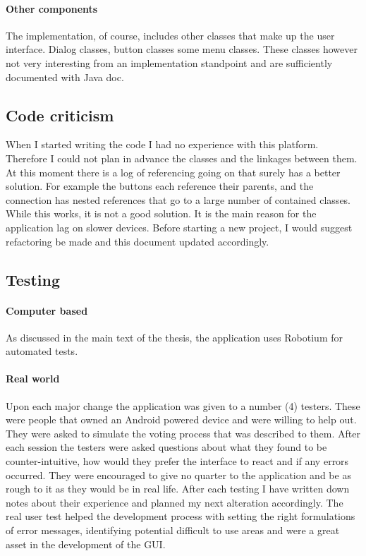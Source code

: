 \documentclass[11pt]{article} %
\begin{document}
\paragraph{Other components}
The implementation, of course, includes other classes that make up the user interface. Dialog classes, button classes some menu classes. These classes however not very interesting from an implementation standpoint and are sufficiently documented with Java doc.
\subsection{Code criticism}
When I started writing the code I had no experience with this platform. Therefore I could not plan in advance the classes and the linkages between them. At this moment there is a log of referencing going on that surely has a better solution. For example the buttons each reference their parents, and the connection has nested references that go to a large number of contained classes. While this works, it is not a good solution. It is the main reason for the application lag on slower devices. Before starting a new project, I would suggest refactoring be made and this document updated accordingly.
\subsection{Testing}
\paragraph{Computer based}
As discussed in the main text of the thesis, the application uses Robotium for automated tests.
\paragraph{Real world}
Upon each major change the application was  given to a number (4) testers. These were people that owned an Android powered device and were willing to help out. They were asked to simulate the voting process that was described to them. After each session the testers were asked questions about what they found to be counter-intuitive, how would they prefer the interface to react and if any errors occurred. They were encouraged to give no quarter to the application and be as rough to it as they would be in real life. After each testing I have written down notes about their experience and planned my next alteration accordingly. The real user test helped the development process with setting the right formulations of error messages, identifying potential difficult to use areas and were a great asset in the development of the GUI.
\end{document}
